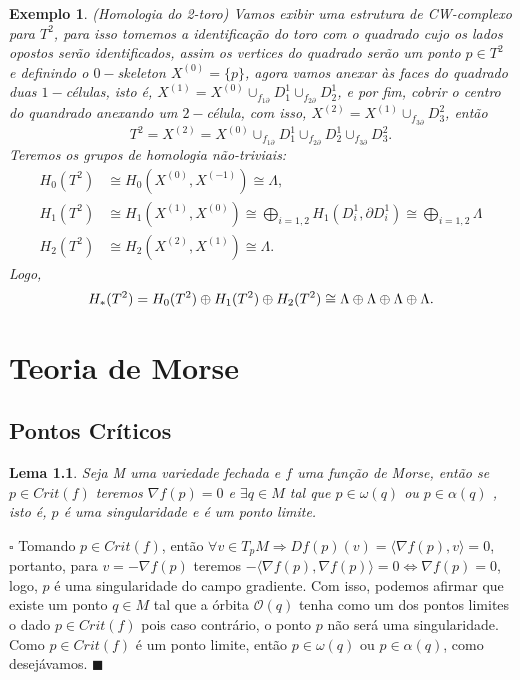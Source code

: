 \documentclass[12pt]{book}
\newtheorem{lema}[teorema]{Lema}
\newtheorem{exemplo}[teorema]{Exemplo}
\newenvironment{prova}[1]{$\square$ #1}{\hfill$\blacksquare$}
\newcommand{\celula}[2]{D^{#1}_{#2}}
\newcommand{\homologia}[2]{H_{#1}(#2)}
\newcommand{\homologiarelcel}[3]{H_{#1}(D^{#2}_{#3}, \partial D^{#2}_{#3})}
\newcommand{\homologiarelskele}[3]{H_{#1}(X^{(#2)}, X^{(#3)})}
\newcommand{\somadir}[1]{\bigoplus \limits_{#1}}
\newcommand{\innerprod}[2]{\langle #1, #2 \rangle}
\newcommand{\skeleton}[1]{X^{(#1)}}
\begin{document}
	\begin{exemplo}
		(Homologia do 2-toro) Vamos exibir uma estrutura de CW-complexo para $T^{2}$, para isso tomemos a identificação do toro com o quadrado cujo os lados opostos serão identificados, assim os vertices do quadrado serão um ponto $p \in T^{2}$ e definindo o $0-$skeleton $\skeleton{0} = \{p\}$, agora vamos anexar às faces do quadrado duas $1-$células, isto é, $\skeleton{1} = \skeleton{0}\cup_{f_{1\partial}}\celula{1}{1}\cup_{f_{2\partial}}\celula{1}{2}$, e por fim, cobrir o centro do quandrado anexando um $2-$célula, com isso, $\skeleton{2} = \skeleton{1}\cup_{f_{3\partial}}\celula{2}{3}$, então
		$$
		T^{2} =\skeleton{2} = \skeleton{0}\cup_{f_{1\partial}}\celula{1}{1}\cup_{f_{2\partial}}\celula{1}{2}\cup_{f_{3\partial}}\celula{2}{3}.
		$$
		Teremos os grupos de homologia não-triviais:
		$$
		\begin{aligned}
		\homologia{0}{T^{2}} &\cong \homologiarelskele{0}{0}{-1} \cong \Lambda,
		\\
		\homologia{1}{T^{2}} &\cong \homologiarelskele{1}{1}{0} \cong \somadir{i=1,2}\homologiarelcel{1}{1}{i} \cong \somadir{i=1,2}\Lambda
		\\
		\homologia{2}{T^{2}} &\cong \homologiarelskele{2}{2}{1} \cong \Lambda.
		\end{aligned}
		$$
		Logo,
		$$
		\\
		\homologia{*}{T^{2}} = \homologia{0}{T^{2}}\oplus\homologia{1}{T^{2}} \oplus\homologia{2}{T^{2}}\cong \Lambda\oplus\Lambda\oplus\Lambda\oplus\Lambda.
		$$
	\end{exemplo}	
	
	\chapter{Teoria de Morse}
	\section{Pontos Críticos}
	
	\begin{lema}
		Seja M uma variedade fechada e $f$ uma função de Morse, então se $p \in Crit(f)$ teremos $\nabla f(p)=0$ e $\exists q \in M$ tal que $p \in \omega(q)$ ou $p \in \alpha(q)$ , isto é, $p$ é uma singularidade e é um ponto limite.
	\end{lema}
	\begin{prova}
		Tomando $p \in Crit(f)$, então $\forall v \in T_{p}M \Rightarrow Df(p)(v) = \innerprod{\nabla f(p)}{v} = 0$, portanto, para $v = -\nabla f(p)$ teremos $-\innerprod{\nabla f(p)}{\nabla f(p)} = 0 \iff \nabla f(p) = 0$, logo, $p$ é uma singularidade do campo gradiente. Com isso, podemos afirmar que existe um ponto $q \in M$ tal que a órbita $\mathcal{O}(q)$ tenha como um dos pontos limites o dado $p \in Crit(f)$ pois caso contrário, o ponto $p$ não será uma singularidade. Como $p \in Crit(f)$ é um ponto limite, então $p \in \omega(q)$ ou $p \in \alpha(q)$, como desejávamos.
	\end{prova}
	
\end{document}
